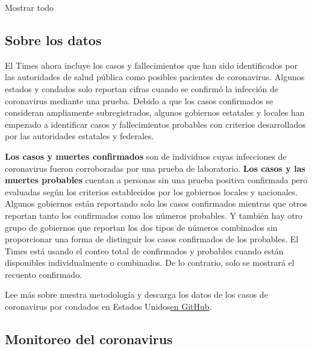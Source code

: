 Mostrar todo

\hypertarget{sobre-los-datos}{%
\subsection{Sobre los datos}\label{sobre-los-datos}}

El Times ahora incluye los casos y fallecimientos que han sido
identificados por las autoridades de salud pública como posibles
pacientes de coronavirus. Algunos estados y condados solo reportan
cifras cuando se confirmó la infección de coronavirus mediante una
prueba. Debido a que los casos confirmados se consideran ampliamente
subregistrados, algunos gobiernos estatales y locales han empezado a
identificar casos y fallecimientos probables con criterios desarrollados
por las autoridades estatales y federales.

\textbf{Los casos y muertes confirmados} son de individuos cuyas
infecciones de coronavirus fueron corroboradas por una prueba de
laboratorio. \textbf{Los casos y las muertes probables} cuentan a
personas sin una prueba positiva confirmada pero evaluadas según los
criterios establecidos por los gobiernos locales y nacionales. Algunos
gobiernos están reportando solo los casos confirmados mientras que otros
reportan tanto los confirmados como los números probables. Y también hay
otro grupo de gobiernos que reportan los dos tipos de números combinados
sin proporcionar una forma de distinguir los casos confirmados de los
probables. El Times está usando el conteo total de confirmados y
probables cuando están disponibles individualmente o combinados. De lo
contrario, solo se mostrará el recuento confirmado.

Lee más sobre nuestra metodología y descarga los datos de los casos de
coronavirus por condados en Estados
Unidos\href{https://github.com/nytimes/covid-19-data}{en GitHub}.

\hypertarget{monitoreo-del-coronavirus}{%
\subsection{Monitoreo del coronavirus}\label{monitoreo-del-coronavirus}}

